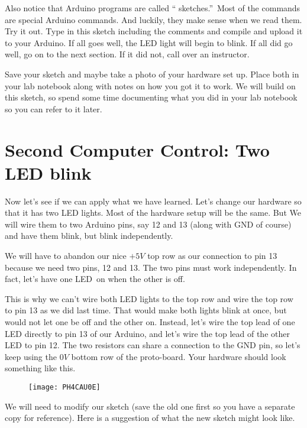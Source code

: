 Also notice that Arduino programs are called \textquotedblleft
sketches.\textquotedblright\ Most of the commands are special Arduino
commands. And luckily, they make sense when we read them. Try it out. Type
in this sketch including the comments and compile and upload it to your
Arduino. If all goes well, the LED light will begin to blink. If all did go
well, go on to the next section. If it did not, call over an instructor.

Save your sketch and maybe take a photo of your hardware set up. Place both
in your lab notebook along with notes on how you got it to work. We will
build on this sketch, so spend some time documenting what you did in your
lab notebook so you can refer to it later.

\section{Second Computer Control: Two LED blink}

Now let's see if we can apply what we have learned. Let's change our
hardware so that it has two LED lights. Most of the hardware setup will be
the same. But We will wire them to two Arduino pins, say 12 and 13 (along
with GND of course) and have them blink, but blink independently.

We will have to abandon our nice $+5\unit{V}$ top row as our connection to
pin 13 because we need two pins, 12 and 13. The two pins must work
independently. In fact, let's have one LED\ on when the other is off.

This is why we can't wire both LED lights to the top row and wire the top
row to pin 13 as we did last time. That would make both lights blink at
once, but would not let one be off and the other on. Instead, let's wire the
top lead of one LED directly to pin 13 of our Arduino, and let's wire the
top lead of the other LED to pin 12. The two resistors can share a
connection to the GND pin, so let's keep using the $0\unit{V}$ bottom row of
the proto-board. Your hardware should look something like this.

\begin{figure}[h!]
\texttt{[image: PH4CAU0E]}
\end{figure}We will need to modify our sketch
(save the old one first so you have a separate copy for reference). Here is
a suggestion of what the new sketch might look like.




